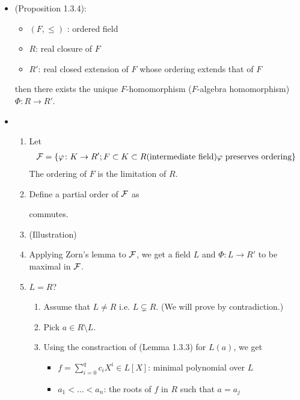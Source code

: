 \documentclass[9pt]{ltjsarticle}
\begin{document}
\begin{itemize}
  \item (Proposition 1.3.4):
  \begin{itemize}
    \item $(F,\le )$ : ordered field
    \item $R$: real closure of $F$
    \item $R'$: real closed extension of $F$ whose ordering extends that of $F$

  \end{itemize}
  then there exists the unique $F$-homomorphism ($F$-algebra homomorphism)  $\varPhi \colon R\to R'$.
  \item
  \pf
  \begin{enumerate}
    \item
    Let
    \begin{align}
      \cal F =
      \set{\varphi\colon K \to R' ; F\subset K \subset R \text{(intermediate field)} \text{$\varphi$ preserves ordering}}
    \end{align}
    The ordering of $F$ is the limitation of $R$.
    \item
    Define a partial order of $\cal F$ as
     commutes.
    \item
    (Illustration)
    \item
    Applying Zorn's lemma to $\cal F$, we get a field $L$ and $\varPhi\colon L\to R'$
    to be maximal in $\cal F$.
    \item $L = R$?
    \begin{enumerate}
      \item
      Assume that $L \neq R$ i.e. $L\subsetneq R$. (We will prove by contradiction.)
      \item
      Pick $a\in R\setminus L$.
      \item
      Using the constraction of (Lemma 1.3.3) for $L(a)$,
      we get
      \begin{itemize}
        \item $f = \sum_{i=0}^q c_i X^i \in L[X]$: minimal polynomial over $L$
        \item $a_1 < \dots < a_n$: the roots of $f$ in $R$ such that $a=a_j$

\end{itemize}
\end{enumerate}
\end{enumerate}
\end{itemize}
\end{document}
